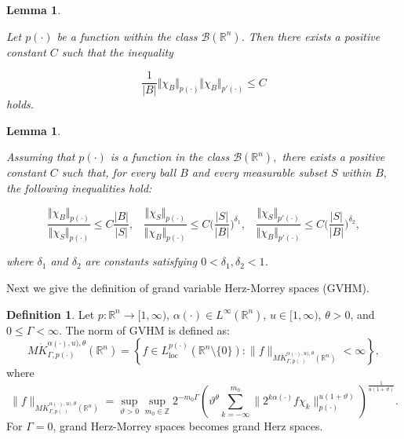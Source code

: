 \documentclass[oneside,reqno]{amsart}
\newtheorem{lem}[theorem]{Lemma}
\numberwithin{equation}{section}
\theoremstyle{definition}
\newtheorem{defn}[theorem]{Definition}
\begin{document}
\begin{lem}\cite{n17}


Let $p(\cdot)$ be a function within the class $\mathcal{B}(\mathbb{R}^{n})$. Then there exists a positive constant $C$ such that the inequality


$$\frac{1}{ \vert B \vert } \Vert \chi_{B} \Vert _{{p(\cdot)}} \Vert \chi_{B} \Vert _{{p'(\cdot)}}\leq C$$
holds.
\end{lem}


\begin{lem}\cite{n17}



Assuming that $p(\cdot)$ is a function in the class $\mathcal{B}(\mathbb{R}^{n}),$ there exists a positive constant $C$ such that, for every ball $B$  and every measurable subset $S$ within $B,$ the following inequalities hold:


$$\frac{ \Vert \chi_{B} \Vert _{{p(\cdot)}}}{ \Vert \chi_{S} \Vert _{{p(\cdot)}}}\leq C \frac{ \vert B \vert }{ \vert S \vert },\;\;\; \frac{ \Vert \chi_{S} \Vert _{{p(\cdot)}}}{ \Vert \chi_{B} \Vert _{{p(\cdot)}}}\leq C \biggl( \frac{ \vert S \vert }{ \vert B \vert } \biggr)^{\delta_{1}}, \;\;\;\frac{ \Vert \chi_{S} \Vert _{{p'(\cdot)}}}{ \Vert \chi_{B} \Vert _{{p'(\cdot)}}}\leq C \biggl(\frac{ \vert S \vert }{ \vert B \vert } \biggr)^{\delta_{2}},$$

where $\delta_{1}$ and $\delta_{2}$ are constants satisfying $0<\delta_{1}, \delta_{2}<1$.
\end{lem}


  













Next we  give the definition of grand variable Herz-Morrey  spaces (GVHM).


\begin{defn}
	 Let  $p :\mathbb{R}^n \rightarrow [1,\infty)$, $\alpha(\cdot) \in L^\infty(\mathbb{R}^n)$, $ u \in [1, \infty)$,  $\theta >0$, and $0 \leq \Gamma < \infty$. The norm of GVHM is defined as:
	$$M\dot{K} ^{\alpha(\cdot),u),\theta}_{ \Gamma, p(\cdot)}(\mathbb{R}^n)=\left\{ f \in L^{p(\cdot)} _{\mathrm{loc}}(\mathbb{R}^n\setminus\{0\}): \| f \| _ {M\dot{K} ^{\alpha(\cdot),u),\theta}_{ \Gamma, p(\cdot)}(\mathbb{R}^n)} < \infty \right\},$$ 
	where 
	$$\| f \| _ {M\dot{K} ^{\alpha(\cdot),u),\theta}_{ \Gamma, p(\cdot)}(\mathbb{R}^n)}=\sup \limits_{\vartheta>0 } \sup \limits _{ m_0 \in \mathbb{Z}} 2^{-m_0\Gamma } \left( \vartheta   ^\theta  \sum \limits _{{k = -\infty}}^{m_0}  \|2^{k \alpha(\cdot) } f \chi _k \| ^{u(1+\vartheta)}_{{p(\cdot)}}\right)^{\frac{1}{u (1+\vartheta)}}.$$
	For $\Gamma=0$, grand Herz-Morrey  spaces becomes grand Herz spaces.
\end{defn}
\end{document}
